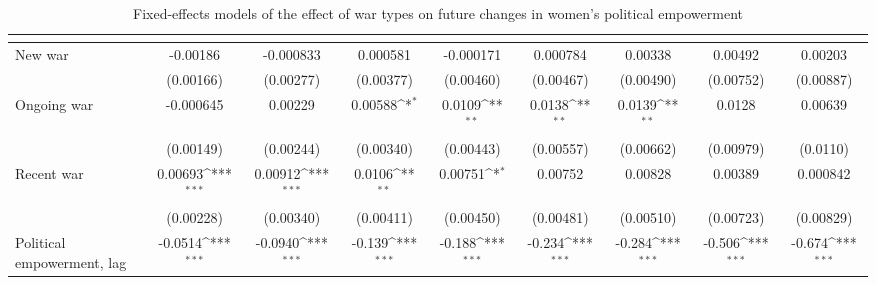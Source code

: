 \begin{table}[htbp]\centering
\def\sym#1{\ifmmode^{#1}\else\(^{#1}\)\fi}
\caption{Fixed-effects models of the effect of war types on future changes in women's political empowerment\label{tab3}}
\begin{tabular}{l*{8}{c}}
\hline\hline
                    &&&&&&&&\\
\hline
New war              &    -0.00186         &   -0.000833         &    0.000581         &   -0.000171         &    0.000784         &     0.00338         &     0.00492         &     0.00203         \\
                    &   (0.00166)         &   (0.00277)         &   (0.00377)         &   (0.00460)         &   (0.00467)         &   (0.00490)         &   (0.00752)         &   (0.00887)         \\
[1em]
Ongoing war          &   -0.000645         &     0.00229         &     0.00588\sym{*}  &      0.0109\sym{**} &      0.0138\sym{**} &      0.0139\sym{**} &      0.0128         &     0.00639         \\
                    &   (0.00149)         &   (0.00244)         &   (0.00340)         &   (0.00443)         &   (0.00557)         &   (0.00662)         &   (0.00979)         &    (0.0110)         \\
[1em]
Recent war           &     0.00693\sym{***}&     0.00912\sym{***}&      0.0106\sym{**} &     0.00751\sym{*}  &     0.00752         &     0.00828         &     0.00389         &    0.000842         \\
                    &   (0.00228)         &   (0.00340)         &   (0.00411)         &   (0.00450)         &   (0.00481)         &   (0.00510)         &   (0.00723)         &   (0.00829)         \\
[1em]
Political empowerment, lag   &     -0.0514\sym{***}&     -0.0940\sym{***}&      -0.139\sym{***}&      -0.188\sym{***}&      -0.234\sym{***}&      -0.284\sym{***}&      -0.506\sym{***}&      -0.674\sym{***}\\

\end{tabular}
\end{table}
